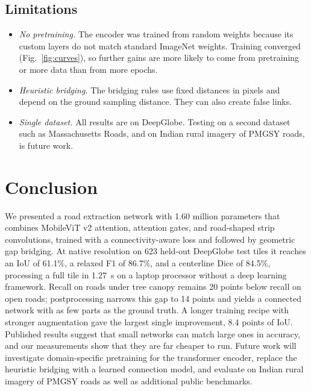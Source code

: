 \documentclass{ieeeaccess}
\begin{document}
\subsection{Limitations}

\begin{itemize}

\item \emph{No pretraining.} The encoder was trained from random weights because its custom layers do not match standard ImageNet weights. Training converged (Fig.~\ref{fig:curves}), so further gains are more likely to come from pretraining or more data than from more epochs.

\item \emph{Heuristic bridging.} The bridging rules use fixed distances in pixels and depend on the ground sampling distance. They can also create false links.

\item \emph{Single dataset.} All results are on DeepGlobe. Testing on a second dataset such as Massachusetts Roads, and on Indian rural imagery of PMGSY roads, is future work.

\end{itemize}

\section{Conclusion}
\label{sec:conclusion}

We presented a road extraction network with 1.60 million parameters that combines MobileViT v2 attention, attention gates, and road-shaped strip convolutions, trained with a connectivity-aware loss and followed by geometric gap bridging. At native resolution on 623 held-out DeepGlobe test tiles it reaches an IoU of 61.1\%, a relaxed F1 of 86.7\%, and a centerline Dice of 84.5\%, processing a full tile in 1.27~s on a laptop processor without a deep learning framework. Recall on roads under tree canopy remains 20 points below recall on open roads; postprocessing narrows this gap to 14 points and yields a connected network with as few parts as the ground truth. A longer training recipe with stronger augmentation gave the largest single improvement, 8.4 points of IoU. Published results suggest that small networks can match large ones in accuracy, and our measurements show that they are far cheaper to run. Future work will investigate domain-specific pretraining for the transformer encoder, replace the heuristic bridging with a learned connection model, and evaluate on Indian rural imagery of PMGSY roads as well as additional public benchmarks.
\end{document}
